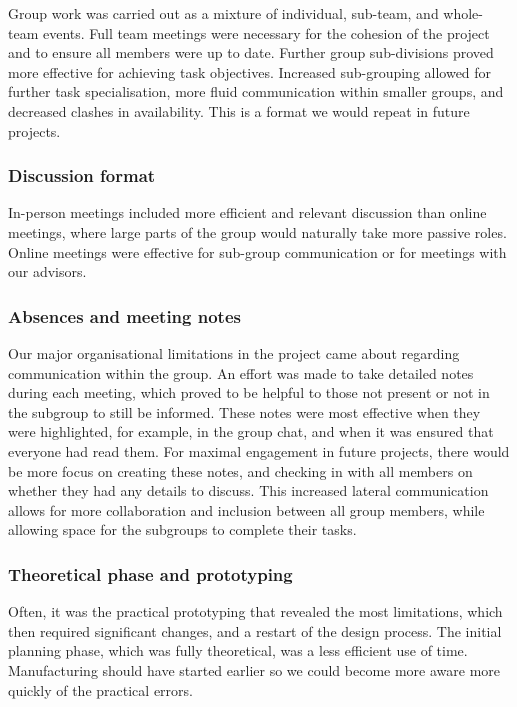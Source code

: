 \documentclass[letterpaper,12pt]{article}
\begin{document}
Group work was carried out as a mixture of individual, sub-team, and whole-team events. Full team meetings were necessary for the cohesion of the project and to ensure all members were up to date. Further group sub-divisions proved more effective for achieving task objectives.  Increased sub-grouping allowed for further task specialisation, more fluid communication within smaller groups, and decreased clashes in availability. This is a format we would repeat in future projects.  

\subsubsection{Discussion format}

In-person meetings included more efficient and relevant discussion than online meetings, where large parts of the group would naturally take more passive roles. Online meetings were effective for sub-group communication or for meetings with our advisors.  

\subsubsection{Absences and meeting notes}

Our major organisational limitations in the project came about regarding communication within the group. An effort was made to take detailed notes during each meeting, which proved to be helpful to those not present or not in the subgroup to still be informed. These notes were most effective when they were highlighted, for example, in the group chat, and when it was ensured that everyone had read them. For maximal engagement in future projects, there would be more focus on creating these notes, and checking in with all members on whether they had any details to discuss. This increased lateral communication allows for more collaboration and inclusion between all group members, while allowing space for the subgroups to complete their tasks.   

\subsubsection{Theoretical phase and prototyping }

Often, it was the practical prototyping that revealed the most limitations, which then required significant changes, and a restart of the design process. The initial planning phase, which was fully theoretical, was a less efficient use of time. Manufacturing should have started earlier so we could become more aware more quickly of the practical errors. 
\end{document}

